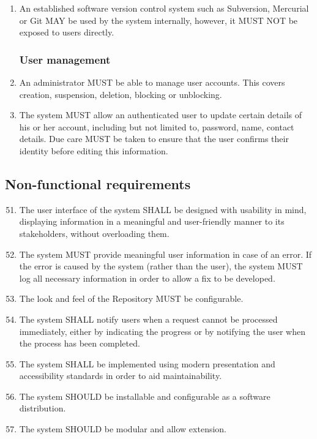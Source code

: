 \begin{enumerate}[1]
\item An established software version control system such as Subversion, Mercurial or Git MAY be used by the system internally, however, it MUST NOT be exposed to users directly.

\subsubsection{User management}
\item An administrator MUST be able to manage user accounts. This covers creation, suspension, deletion, blocking or unblocking.

\item The system MUST allow an authenticated user to update certain details of his or her account, including but not limited to, password, name, contact details. Due care MUST be taken to ensure that the user confirms their identity before editing this information.
\end{enumerate}

\subsection{Non-functional requirements}
\label{nonFunctionalRequirements}
\begin{enumerate}[1]
\setcounter{enumi}{50}

\item The user interface of the system SHALL be designed with usability in mind, displaying information in a meaningful and user-friendly manner to its stakeholders, without overloading them.

\item The system MUST provide meaningful user information in case of an error. If the error is caused by the system (rather than the user), the system MUST log all necessary information in order to allow a fix to be developed.

\item The look and feel of the Repository MUST be configurable.

\item The system SHALL notify users when a request cannot be processed immediately, either by indicating the progress or by notifying the user when the \gls{process} has been completed.

\item The system SHALL be implemented using modern presentation and accessibility standards in order to aid maintainability.

\item The system SHOULD be installable and configurable as a software distribution.

\item The system SHOULD be modular and allow extension.
\end{enumerate}

